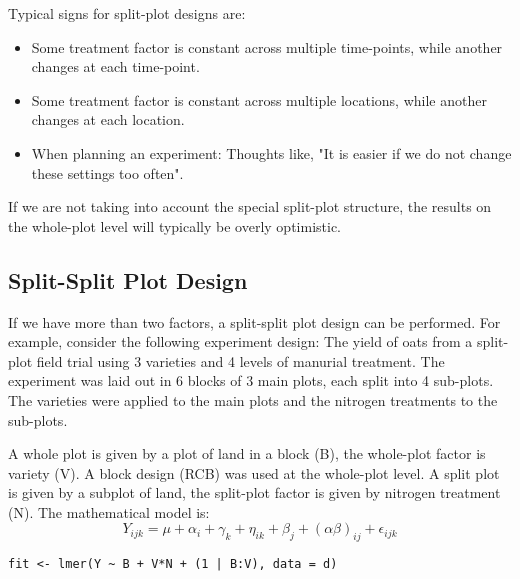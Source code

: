 Typical signs for split-plot designs are:
\begin{itemize}
	\item Some treatment factor is constant across multiple time-points, while another changes at each time-point.
	\item Some treatment factor is constant across multiple locations, while another changes at each location.
	\item When planning an experiment: Thoughts like, "It is easier if we do not change these settings too often".
\end{itemize}

If we are not taking into account the special split-plot structure, the results on the whole-plot level will typically be overly optimistic.


\subsection{Split-Split Plot Design}

If we have more than two factors, a split-split plot design can be performed. For example, consider the following experiment design: The yield of oats from a split-plot field trial using 3 varieties and 4 levels of manurial treatment. The experiment was laid out in 6 blocks of 3 main plots, each split into 4 sub-plots. The varieties were applied to the main plots and the nitrogen treatments to the sub-plots. \medskip

A whole plot is given by a plot of land in a block (B), the whole-plot factor is variety (V). A block design (RCB) was used at the whole-plot level. A split plot is given by a subplot of land, the split-plot factor is given by nitrogen treatment (N). The mathematical model is:
$$Y_{ijk} = \mu + \alpha_i + \gamma_k + \eta_{ik} + \beta _j + (\alpha \beta)_{ij} + \epsilon_{ijk}$$

\begin{lstlisting}
fit <- lmer(Y ~ B + V*N + (1 | B:V), data = d)
\end{lstlisting}